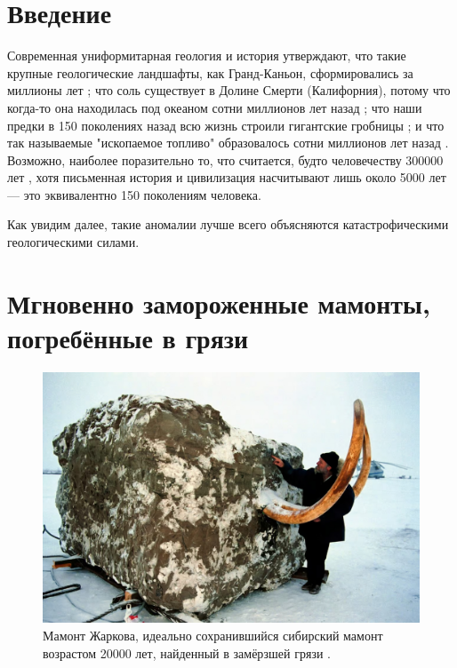 \documentclass[10pt,twocolumn,letterpaper]{article}
\begin{document}

\section{Введение}

Современная униформитарная геология и история утверждают, что такие крупные геологические ландшафты, как Гранд-Каньон, сформировались за миллионы лет \cite{143}; что соль существует в Долине Смерти (Калифорния), потому что когда-то она находилась под океаном сотни миллионов лет назад \cite{144}; что наши предки в 150 поколениях назад всю жизнь строили гигантские гробницы \cite{29,70}; и что так называемые "ископаемое топливо" образовалось сотни миллионов лет назад \cite{104}. Возможно, наиболее поразительно то, что считается, будто человечеству 300000 лет \cite{145}, хотя письменная история и цивилизация насчитывают лишь около 5000 лет — это эквивалентно 150 поколениям человека.

Как увидим далее, такие аномалии лучше всего объясняются катастрофическими геологическими силами.

\section{Мгновенно замороженные мамонты, погребённые в грязи}

\begin{figure}[t]
\begin{center}
   \includegraphics[width=1\linewidth]{jarkov-mammoth.jpg}
\end{center}
   \caption{Мамонт Жаркова, идеально сохранившийся сибирский мамонт возрастом 20000 лет, найденный в замёрзшей грязи \cite{51}.}
\label{fig:1}
\label{fig:onecol}
\end{figure}
\end{document}
